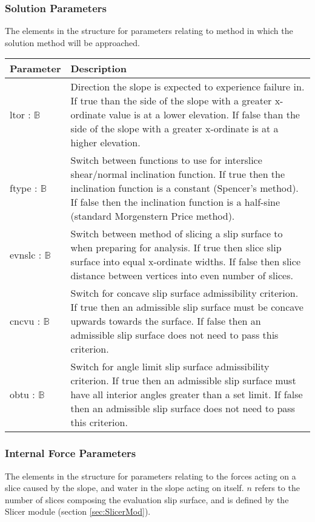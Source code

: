 \documentclass[12pt, titlepage]{article}
\begin{document}
\subsubsection{Solution Parameters} \label{Tbl:SolnParam}
\noindent
The elements in the structure for parameters relating to method in
which the solution method will be approached.

\begin{center}
\begin{longtable}{ p{} 
    p{}}\hline 

  \textbf{Parameter} & \textbf{Description}\\ \hline

  ltor : $\mathbb{B}$ & Direction the slope is expected to
  experience failure in. If true than the side of the slope with a
  greater x-ordinate value is at a lower elevation. If false than the
  side of the slope with a greater x-ordinate is at a higher
  elevation.\\

  ftype : $\mathbb{B}$ & Switch between functions to use for
  interslice shear/normal inclination function. If true then the
  inclination function is a constant (Spencer's method). If false then
  the inclination function is a half-sine (standard Morgenstern Price
  method). \\

  evnslc : $\mathbb{B}$ & Switch between method of slicing a slip
  surface to when preparing for analysis. If true then slice slip
  surface into equal x-ordinate widths. If false then slice distance
  between vertices into even number of slices. \\

  cncvu : $\mathbb{B}$ & Switch for concave slip surface admissibility
  criterion. If true then an admissible slip surface must be concave
  upwards towards the surface. If false then an admissible slip
  surface does not need to pass this criterion.\\

  obtu : $\mathbb{B}$ & Switch for angle limit slip surface
  admissibility criterion. If true then an admissible slip surface
  must have all interior angles greater than a set limit. If false
  then an admissible slip surface does not need to pass this
  criterion.\\ \hline
\end{longtable}
\end{center}

\subsubsection{Internal Force Parameters} \label{Tbl:ForceParam}
\noindent
The elements in the structure for parameters relating to the forces
acting on a slice caused by the slope, and water in the slope acting
on itself. $n$ refers to the number of slices composing the evaluation
slip surface, and is defined by the Slicer module (section
\ref{sec:SlicerMod}).
\end{document}
